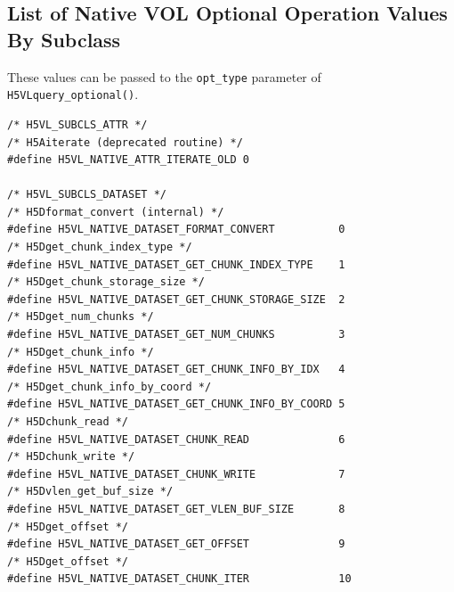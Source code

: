 \subsection{List of Native VOL Optional Operation Values By Subclass}

These values can be passed to the {\tt opt\_type} parameter of {\tt H5VLquery\_optional()}.

\begin{lstlisting}
/* H5VL_SUBCLS_ATTR */
/* H5Aiterate (deprecated routine) */
#define H5VL_NATIVE_ATTR_ITERATE_OLD 0 

/* H5VL_SUBCLS_DATASET */
/* H5Dformat_convert (internal) */
#define H5VL_NATIVE_DATASET_FORMAT_CONVERT          0  
/* H5Dget_chunk_index_type */
#define H5VL_NATIVE_DATASET_GET_CHUNK_INDEX_TYPE    1  
/* H5Dget_chunk_storage_size */
#define H5VL_NATIVE_DATASET_GET_CHUNK_STORAGE_SIZE  2  
/* H5Dget_num_chunks */
#define H5VL_NATIVE_DATASET_GET_NUM_CHUNKS          3  
/* H5Dget_chunk_info */
#define H5VL_NATIVE_DATASET_GET_CHUNK_INFO_BY_IDX   4  
/* H5Dget_chunk_info_by_coord */
#define H5VL_NATIVE_DATASET_GET_CHUNK_INFO_BY_COORD 5  
/* H5Dchunk_read */
#define H5VL_NATIVE_DATASET_CHUNK_READ              6  
/* H5Dchunk_write */
#define H5VL_NATIVE_DATASET_CHUNK_WRITE             7  
/* H5Dvlen_get_buf_size */
#define H5VL_NATIVE_DATASET_GET_VLEN_BUF_SIZE       8  
/* H5Dget_offset */
#define H5VL_NATIVE_DATASET_GET_OFFSET              9  
/* H5Dget_offset */
#define H5VL_NATIVE_DATASET_CHUNK_ITER              10 


\end{lstlisting}
